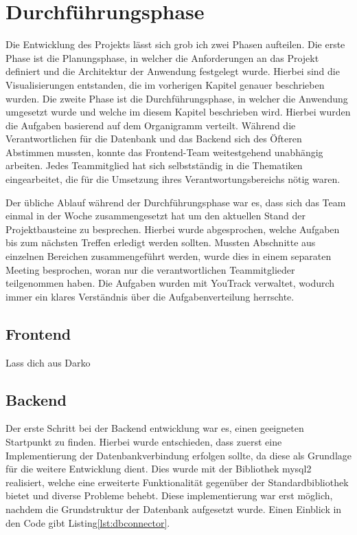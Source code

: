 \section{Durchführungsphase}\label{sec:Durchfuehrungsphase}
Die Entwicklung des Projekts lässt sich grob ich zwei Phasen aufteilen.
Die erste Phase ist die Planungsphase, in welcher die Anforderungen an das Projekt definiert und die Architektur der Anwendung festgelegt wurde.
Hierbei sind die Visualisierungen entstanden, die im vorherigen Kapitel genauer beschrieben wurden.
Die zweite Phase ist die Durchführungsphase, in welcher die Anwendung umgesetzt wurde und welche im diesem Kapitel beschrieben wird.
Hierbei wurden die Aufgaben basierend auf dem Organigramm verteilt.
Während die Verantwortlichen für die Datenbank und das Backend sich des Öfteren Abstimmen mussten, konnte das Frontend-Team weitestgehend unabhängig arbeiten.
Jedes Teammitglied hat sich selbstständig in die Thematiken eingearbeitet, die für die Umsetzung ihres Verantwortungsbereichs nötig waren.

Der übliche Ablauf während der Durchführungsphase war es, dass sich das Team einmal in der Woche zusammengesetzt hat um den aktuellen Stand der Projektbausteine zu besprechen.
Hierbei wurde abgesprochen, welche Aufgaben bis zum nächsten Treffen erledigt werden sollten.
Mussten Abschnitte aus einzelnen Bereichen zusammengeführt werden, wurde dies in einem separaten Meeting besprochen, woran nur die verantwortlichen Teammitglieder teilgenommen haben.
Die Aufgaben wurden mit YouTrack verwaltet, wodurch immer ein klares Verständnis über die Aufgabenverteilung herrschte.

\subsection{Frontend}\label{subsec:Frontend}
Lass dich aus Darko

\subsection{Backend}\label{subsec:backend}
Der erste Schritt bei der Backend entwicklung war es, einen geeigneten Startpunkt zu finden.
Hierbei wurde entschieden, dass zuerst eine Implementierung der Datenbankverbindung erfolgen sollte, da diese als Grundlage für die weitere Entwicklung dient.
Dies wurde mit der Bibliothek mysql2 realisiert, welche eine erweiterte Funktionalität gegenüber der Standardbibliothek bietet und diverse Probleme behebt.
Diese implementierung war erst möglich, nachdem die Grundstruktur der Datenbank aufgesetzt wurde.
Einen Einblick in den Code gibt Listing\ref{lst:dbconnector}.

